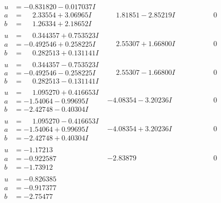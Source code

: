 \documentclass[1p]{elsarticle_modified}
\theoremstyle{definition}
\begin{document}
$$\begin{array}{c|c|c}
\begin{aligned}
u &= -0.831820 - 0.017037 I \\
a &= \phantom{-}2.33554 + 3.06965 I \\
b &= \phantom{-}1.26334 + 2.18652 I\end{aligned}
 & \phantom{-}1.81851 - 2.85219 I & \phantom{-0.000000 } 0 \\ \hline\begin{aligned}
u &= \phantom{-}0.344357 + 0.753523 I \\
a &= -0.492546 + 0.258225 I \\
b &= \phantom{-}0.282513 + 0.131141 I\end{aligned}
 & \phantom{-}2.55307 + 1.66800 I & \phantom{-0.000000 } 0 \\ \hline\begin{aligned}
u &= \phantom{-}0.344357 - 0.753523 I \\
a &= -0.492546 - 0.258225 I \\
b &= \phantom{-}0.282513 - 0.131141 I\end{aligned}
 & \phantom{-}2.55307 - 1.66800 I & \phantom{-0.000000 } 0 \\ \hline\begin{aligned}
u &= \phantom{-}1.095270 + 0.416653 I \\
a &= -1.54064 - 0.99695 I \\
b &= -2.42748 - 0.40304 I\end{aligned}
 & -4.08354 - 3.20236 I & \phantom{-0.000000 } 0 \\ \hline\begin{aligned}
u &= \phantom{-}1.095270 - 0.416653 I \\
a &= -1.54064 + 0.99695 I \\
b &= -2.42748 + 0.40304 I\end{aligned}
 & -4.08354 + 3.20236 I & \phantom{-0.000000 } 0 \\ \hline\begin{aligned}
u &= -1.17213\phantom{ +0.000000I} \\
a &= -0.922587\phantom{ +0.000000I} \\
b &= -1.73912\phantom{ +0.000000I}\end{aligned}
 & -2.83879\phantom{ +0.000000I} & \phantom{-0.000000 } 0 \\ \hline\begin{aligned}
u &= -0.826385\phantom{ +0.000000I} \\
a &= -0.917377\phantom{ +0.000000I} \\
b &= -2.75477\phantom{ +0.000000I}\end{aligned}

\end{array}$$
\end{document}
